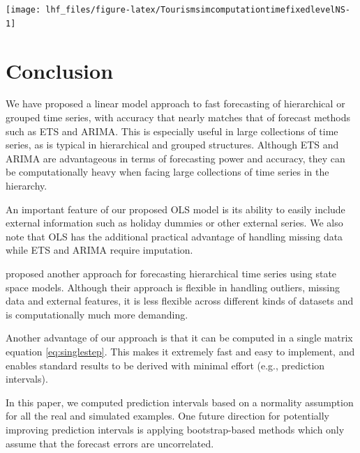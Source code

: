 \documentclass[11pt,a4paper,]{article}
\let\origfigure\figure
\let\endorigfigure\endfigure
\renewenvironment{figure}[1][2] {
    \expandafter\origfigure\expandafter[!htbp]
} {
    \endorigfigure
}
\begin{document}
\begin{figure}

{\centering \texttt{[image: lhf\_files/figure-latex/TourismsimcomputationtimefixedlevelNS-1]} 

}

\caption{Computation time (seconds) for fixed origin reconciled forecasts using ETS, ARIMA and OLS, by number of bottom-level series (x-axis), and by levels of hierarchy (panels). Simulated series has error value 0.5 and 24 months test set.}\label{fig:TourismsimcomputationtimefixedlevelNS}
\end{figure}

\FloatBarrier

\hypertarget{conclusion}{%
\section{Conclusion}\label{conclusion}}

We have proposed a linear model approach to fast forecasting of hierarchical or grouped time series, with accuracy that nearly matches that of forecast methods such as ETS and ARIMA. This is especially useful in large collections of time series, as is typical in hierarchical and grouped structures. Although ETS and ARIMA are advantageous in terms of forecasting power and accuracy, they can be computationally heavy when facing large collections of time series in the hierarchy.

An important feature of our proposed OLS model is its ability to easily include external information such as holiday dummies or other external series. We also note that OLS has the additional practical advantage of handling missing data while ETS and ARIMA require imputation.

\textcite{pennings2017} proposed another approach for forecasting hierarchical time series using state space models. Although their approach is flexible in handling outliers, missing data and external features, it is less flexible across different kinds of datasets and is computationally much more demanding.

Another advantage of our approach is that it can be computed in a single matrix equation \eqref{eq:singlestep}. This makes it extremely fast and easy to implement, and enables standard results to be derived with minimal effort (e.g., prediction intervals).

In this paper, we computed prediction intervals based on a normality assumption for all the real and simulated examples. One future direction for potentially improving prediction intervals is applying bootstrap-based methods which only assume that the forecast errors are uncorrelated.
\end{document}
